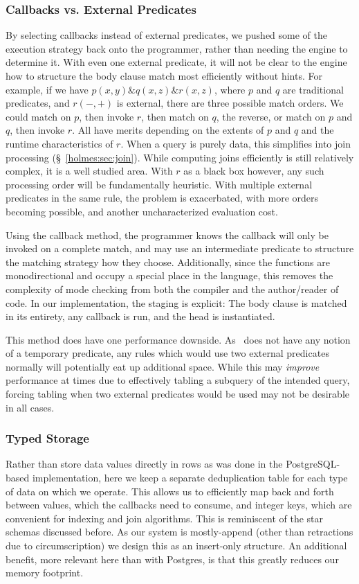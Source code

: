 \subsubsection{Callbacks vs. External Predicates}
\label{holmes:sec:implcall}
By selecting callbacks instead of external predicates, we pushed some of the execution strategy back onto the programmer, rather than needing the engine to determine it.
With even one external predicate, it will not be clear to the engine how to structure the body clause match most efficiently without hints.
For example, if we have $p(x,y) \& q(x, z) \& r(x, z)$, where $p$ and $q$ are traditional predicates, and $r(-, +)$ is external, there are three possible match orders.
We could match on $p$, then invoke $r$, then match on $q$, the reverse, or match on $p$ and $q$, then invoke $r$.
All have merits depending on the extents of $p$ and $q$ and the runtime characteristics of $r$.
When a query is purely data, this simplifies into join processing (\S~\ref{holmes:sec:join}).
While computing joins efficiently is still relatively complex, it is a well studied area.
With $r$ as a black box however, any such processing order will be fundamentally heuristic.
With multiple external predicates in the same rule, the problem is exacerbated, with more orders becoming possible, and another uncharacterized evaluation cost.

Using the callback method, the programmer knows the callback will only be invoked on a complete match, and may use an intermediate predicate to structure the matching strategy how they choose.
Additionally, since the functions are monodirectional and occupy a special place in the language, this removes the complexity of mode checking from both the compiler and the author/reader of code.
In our implementation, the staging is explicit: The body clause is matched in its entirety, any callback is run, and the head is instantiated.

This method does have one performance downside.
As \sysname\ does not have any notion of a temporary predicate, any rules which would use two external predicates normally will potentially eat up additional space.
While this may \emph{improve} performance at times due to effectively tabling a subquery of the intended query, forcing tabling when two external predicates would be used may not be desirable in all cases.
\subsubsection{Typed Storage}
Rather than store data values directly in rows as was done in the PostgreSQL-based implementation, here we keep a separate deduplication table for each type of data on which we operate.
This allows us to efficiently map back and forth between values, which the callbacks need to consume, and integer keys, which are convenient for indexing and join algorithms. 
This is reminiscent of the star schemas discussed before.
As our system is mostly-append (other than retractions due to circumscription) we design this as an insert-only structure.
An additional benefit, more relevant here than with Postgres, is that this greatly reduces our memory footprint.

